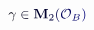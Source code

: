 \documentclass[12pt]{article}
\begin{document}
\makeatletter
\renewcommand*{\@textcolor}[3]{%
  \protect\leavevmode
  \begingroup
    \color#1{#2}#3%
  \endgroup
}
\makeatother
\begin{displaymath}
\mathcolor[RGB]{0,0,15}{\gamma} \mathcolor[RGB]{0,0,30}{\in} \mathbf { \mathcolor[RGB]{0,0,45}{M} } _ { \mathcolor[RGB]{0,0,60}{2} } \mathcolor[RGB]{0,0,75}{(} { \mathcal { \mathcolor[RGB]{0,0,90}{O} } } _ { \mathcolor[RGB]{0,0,105}{B} } \mathcolor[RGB]{0,0,120}{)}
\end{displaymath}
\end{document}

